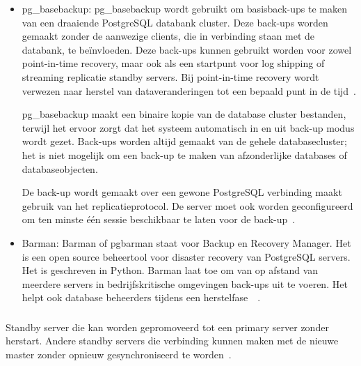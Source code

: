 \begin{itemize}
    \item pg\_basebackup: pg\_basebackup wordt gebruikt om basisback-ups te maken van een draaiende PostgreSQL databank cluster. Deze back-ups worden gemaakt zonder de aanwezige clients, die in verbinding staan met de databank, te beïnvloeden. Deze back-ups kunnen gebruikt worden voor zowel point-in-time recovery, maar ook als een startpunt voor log shipping of streaming replicatie standby servers. Bij point-in-time recovery wordt verwezen naar herstel van dataveranderingen tot een bepaald punt in de tijd~\autocite{MySQL2021}. %
    
    pg\_basebackup maakt een binaire kopie van de database cluster bestanden, terwijl het ervoor zorgt dat het systeem automatisch in en uit back-up modus wordt gezet. Back-ups worden altijd gemaakt van de gehele databasecluster; het is niet mogelijk om een back-up te maken van afzonderlijke databases of databaseobjecten. 
    
    De back-up wordt gemaakt over een gewone PostgreSQL verbinding maakt gebruik van het replicatieprotocol. De server moet ook worden geconfigureerd om ten minste één sessie beschikbaar te laten voor de back-up~\autocite{PostgreSQL2021c}. %
    \newline
    \item Barman: Barman of pgbarman staat voor Backup en Recovery Manager. Het is een open source beheertool voor disaster recovery van PostgreSQL servers. Het is geschreven in Python. Barman laat toe om van op afstand van meerdere servers in bedrijfskritische omgevingen back-ups uit te voeren. Het helpt ook database beheerders tijdens een herstelfase~\autocite{Barman2020}~\autocite{Barman2020a}. %
\end{itemize}


\subsubsection{}
\label{subsubsec:Promotie standby server}
Standby server die kan worden gepromoveerd tot een primary server zonder herstart. Andere standby servers die verbinding kunnen maken met de nieuwe master zonder opnieuw gesynchroniseerd te worden~\autocite{2020a}.

